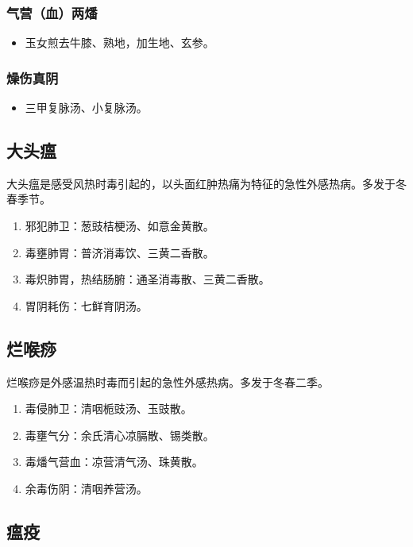 \documentclass[cn,black,12pt,founder,normal,twocolumn]{elegantnote}
\begin{document}
\subsubsection{气营（血）两燔}

\begin{itemize}
    \item 玉女煎去牛膝、熟地，加生地、玄参。
\end{itemize}

\subsubsection{燥伤真阴}

\begin{itemize}
    \item 三甲复脉汤、小复脉汤。
\end{itemize}

\subsection{大头瘟}

大头瘟是感受风热时毒引起的，以头面红肿热痛为特征的急性外感热病。多发于冬春季节。

\begin{enumerate}
    \item 邪犯肺卫：葱豉桔梗汤、如意金黄散。
    \item 毒壅肺胃：普济消毒饮、三黄二香散。
    \item 毒炽肺胃，热结肠腑：通圣消毒散、三黄二香散。
    \item 胃阴耗伤：七鲜育阴汤。
\end{enumerate}

\subsection{烂喉痧}

烂喉痧是外感温热时毒而引起的急性外感热病。多发于冬春二季。

\begin{enumerate}
    \item 毒侵肺卫：清咽栀豉汤、玉豉散。
    \item 毒壅气分：余氏清心凉膈散、锡类散。
    \item 毒燔气营血：凉营清气汤、珠黄散。
    \item 余毒伤阴：清咽养营汤。
\end{enumerate}

\subsection{瘟疫}
\end{document}
